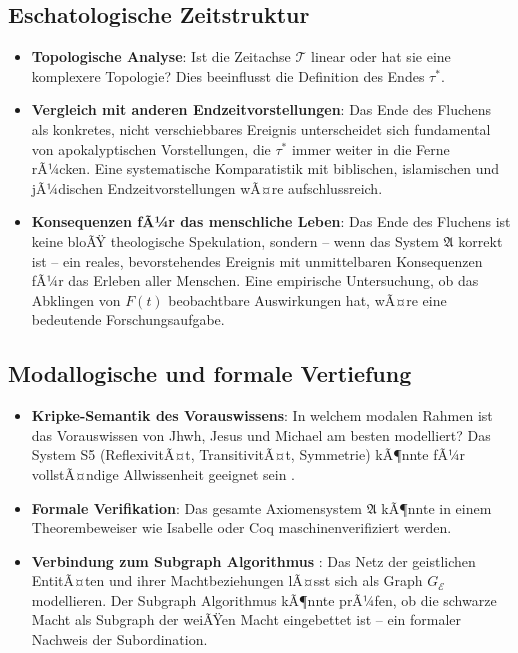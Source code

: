 ﻿\documentclass[a4paper,12pt]{article}
\theoremstyle{definition}
\begin{document}
\subsection{Eschatologische Zeitstruktur}

\begin{itemize}
  \item \textbf{Topologische Analyse}: Ist die Zeitachse $\mathcal{T}$ linear
        oder hat sie eine komplexere Topologie? Dies beeinflusst die Definition
        des Endes $\tau^*$.
  \item \textbf{Vergleich mit anderen Endzeitvorstellungen}: Das Ende des
        Fluchens als konkretes, nicht verschiebbares Ereignis unterscheidet sich
        fundamental von apokalyptischen Vorstellungen, die $\tau^*$ immer
        weiter in die Ferne rÃ¼cken. Eine systematische Komparatistik mit
        biblischen, islamischen und jÃ¼dischen Endzeitvorstellungen
        \cite{middleton2014} wÃ¤re aufschlussreich.
  \item \textbf{Konsequenzen fÃ¼r das menschliche Leben}: Das Ende des Fluchens
        ist keine bloÃŸ theologische Spekulation, sondern -- wenn das System
        $\mathfrak{A}$ korrekt ist -- ein reales, bevorstehendes Ereignis mit
        unmittelbaren Konsequenzen fÃ¼r das Erleben aller Menschen. Eine
        empirische Untersuchung, ob das Abklingen von $F(t)$ beobachtbare
        Auswirkungen hat, wÃ¤re eine bedeutende Forschungsaufgabe.
\end{itemize}

\subsection{Modallogische und formale Vertiefung}

\begin{itemize}
  \item \textbf{Kripke-Semantik des Vorauswissens}: In welchem modalen Rahmen
        ist das Vorauswissen von Jhwh, Jesus und Michael am besten modelliert?
        Das System S5 (ReflexivitÃ¤t, TransitivitÃ¤t, Symmetrie) kÃ¶nnte fÃ¼r
        vollstÃ¤ndige Allwissenheit geeignet sein \cite{kripke1963}.
  \item \textbf{Formale Verifikation}: Das gesamte Axiomensystem $\mathfrak{A}$
        kÃ¶nnte in einem Theorembeweiser wie Isabelle \cite{isabelle2023} oder
        Coq \cite{coq2023} maschinenverifiziert werden.
  \item \textbf{Verbindung zum Subgraph Algorithmus} \cite{epp2026}: Das Netz
        der geistlichen EntitÃ¤ten und ihrer Machtbeziehungen lÃ¤sst sich als
        Graph $G_{\mathcal{E}}$ modellieren. Der Subgraph Algorithmus kÃ¶nnte
        prÃ¼fen, ob die schwarze Macht als Subgraph der weiÃŸen Macht eingebettet
        ist -- ein formaler Nachweis der Subordination.
\end{itemize}
\end{document}
